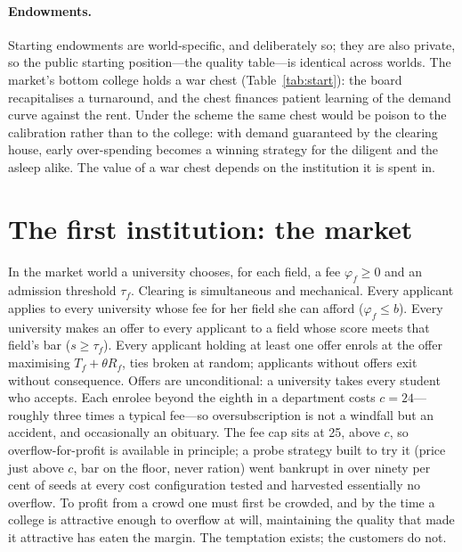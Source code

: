 \documentclass[11pt,a4paper]{article}
\begin{document}
\paragraph{Endowments.} Starting endowments are world-specific, and deliberately so; they are also private, so the public starting position---the quality table---is identical across worlds. The market's bottom college holds a war chest (Table~\ref{tab:start}): the board recapitalises a turnaround, and the chest finances patient learning of the demand curve against the rent. Under the scheme the same chest would be poison to the calibration rather than to the college: with demand guaranteed by the clearing house, early over-spending becomes a winning strategy for the diligent and the asleep alike. The value of a war chest depends on the institution it is spent in.

\section{The first institution: the market}\label{sec:market}

In the market world a university chooses, for each field, a fee $\varphi_f \ge 0$ and an admission threshold $\tau_f$. Clearing is simultaneous and mechanical. Every applicant applies to every university whose fee for her field she can afford ($\varphi_f \le b$). Every university makes an offer to every applicant to a field whose score meets that field's bar ($s \ge \tau_f$). Every applicant holding at least one offer enrols at the offer maximising $T_f + \theta R_f$, ties broken at random; applicants without offers exit without consequence. Offers are unconditional: a university takes every student who accepts. Each enrolee beyond the eighth in a department costs $c = 24$---roughly three times a typical fee---so oversubscription is not a windfall but an accident, and occasionally an obituary. The fee cap sits at 25, above $c$, so overflow-for-profit is available in principle; a probe strategy built to try it (price just above $c$, bar on the floor, never ration) went bankrupt in over ninety per cent of seeds at every cost configuration tested and harvested essentially no overflow. To profit from a crowd one must first be crowded, and by the time a college is attractive enough to overflow at will, maintaining the quality that made it attractive has eaten the margin. The temptation exists; the customers do not.
\end{document}
